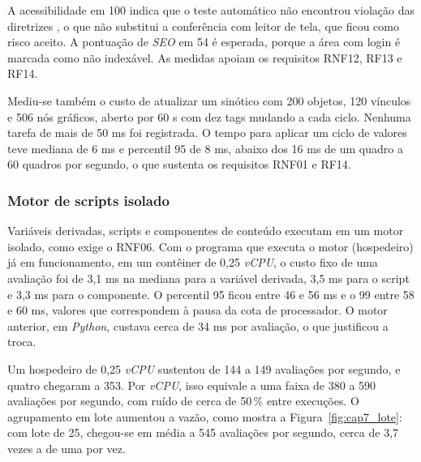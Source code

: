 \par A acessibilidade em 100 indica que o teste automático não encontrou violação das diretrizes , o que não substitui a conferência com leitor de tela, que ficou como risco aceito. A pontuação de \emph{SEO} em 54 é esperada, porque a área com login é marcada como não indexável. As medidas apoiam os requisitos RNF12, RF13 e RF14.


\par Mediu-se também o custo de atualizar um sinótico com 200 objetos, 120 vínculos e 506 nós gráficos, aberto por 60 s com dez tags mudando a cada ciclo. Nenhuma tarefa de mais de 50 ms foi registrada. O tempo para aplicar um ciclo de valores teve mediana de 6 ms e percentil 95 de 8 ms, abaixo dos 16 ms de um quadro a 60 quadros por segundo, o que sustenta os requisitos RNF01 e RF14.

\subsubsection{Motor de scripts isolado}

\par Variáveis derivadas, scripts e componentes de conteúdo executam em um motor isolado, como exige o RNF06. Com o programa que executa o motor (hospedeiro) já em funcionamento, em um contêiner de 0,25 \emph{vCPU}, o custo fixo de uma avaliação foi de 3,1 ms na mediana para a variável derivada, 3,5 ms para o script e 3,3 ms para o componente. O percentil 95 ficou entre 46 e 56 ms e o 99 entre 58 e 60 ms, valores que correspondem à pausa da cota de processador. O motor anterior, em \emph{Python}, custava cerca de 34 ms por avaliação, o que justificou a troca.

\par Um hospedeiro de 0,25 \emph{vCPU} sustentou de 144 a 149 avaliações por segundo, e quatro chegaram a 353. Por \emph{vCPU}, isso equivale a uma faixa de 380 a 590 avaliações por segundo, com ruído de cerca de 50\,\% entre execuções. O agrupamento em lote aumentou a vazão, como mostra a Figura~\ref{fig:cap7_lote}: com lote de 25, chegou-se em média a 545 avaliações por segundo, cerca de 3,7 vezes a de uma por vez.

